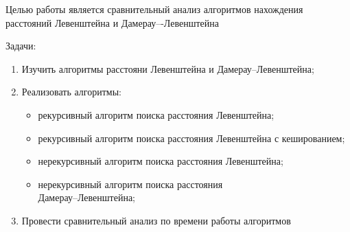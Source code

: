 
Целью работы является сравнительный анализ алгоритмов нахождения расстояний Левенштейна и Дамерау–-Левенштейна

Задачи:
\begin{enumerate}[label={\arabic*)}]
	\item Изучить алгоритмы расстояни Левенштейна и Дамерау--Левенштейна;
	\item Реализовать алгоритмы:
	\begin{itemize}[label=---]
		\item рекурсивный алгоритм поиска расстояния Левенштейна;
		\item рекурсивный алгоритм поиска расстояния Левенштейна с кешированием;
		\item нерекурсивный алгоритм поиска расстояния Левенштейна;
		\item нерекурсивный алгоритм поиска расстояния \\ Дамерау--Левенштейна;
	\end{itemize}
	\item Провести сравнительный анализ по времени работы алгоритмов
\end{enumerate}

\clearpage
